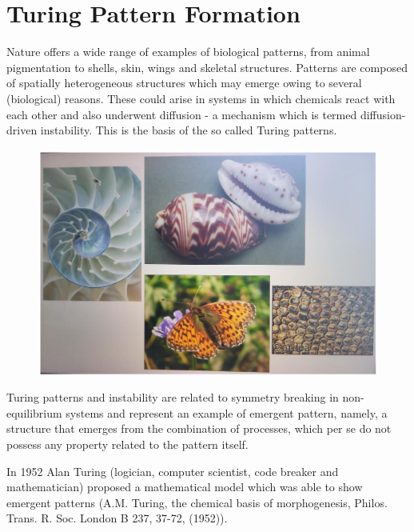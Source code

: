 
\section{Turing Pattern Formation}
Nature offers a wide range of examples of biological patterns, from animal
pigmentation to shells, skin, wings and skeletal structures. Patterns are
composed of spatially heterogeneous structures which may emerge owing to several
(biological) reasons. These could arise in systems in which chemicals react
with each other and also underwent diffusion - a mechanism which is termed
diffusion-driven instability. This is the basis of the so called Turing
patterns.
\begin{figure}[H]
  \centering
  \includegraphics[width=\textwidth]{graphics/2025_10_17_3cf351a4349ae3691080g-01}
\end{figure}

Turing patterns and instability are related to symmetry breaking in
non-equilibrium systems and represent an example of emergent pattern, namely, a
structure that emerges from the combination of processes, which per se do not
possess any property related to the pattern itself.

In 1952 Alan Turing (logician, computer scientist, code breaker and
mathematician) proposed a mathematical model which was able to show emergent
patterns (A.M. Turing, the chemical basis of morphogenesis, Philos. Trans. R.
Soc. London B 237, 37-72, (1952)).

